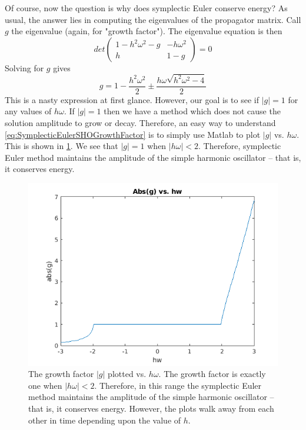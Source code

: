 \documentclass[hidelinks,notitlepage]{book}
\begin{document}
Of course, now the question is why does symplectic Euler conserve energy?  As usual, the answer lies in computing the eigenvalues of the propagator matrix.  Call $g$ the eigenvalue (again, for "growth factor").  The eigenvalue equation is then
\begin{equation}
\nonumber
	det
\begin{pmatrix}
	1 - h^2 \omega^2  - g  &  -h \omega^2 \\
	h & 1 - g
\end{pmatrix}
= 0
\end{equation}
Solving for $g$ gives
\begin{equation}
\label{eq:SymplecticEulerSHOGrowthFactor}
g = 1 - \frac{h^2 \omega^2}{2} \pm \frac{h \omega  \sqrt{h^2 \omega^2 - 4}}{2}
\end{equation}
This is a nasty expression at first glance.  However, our goal is to see if $|g| = 1$ for any values of $h \omega$.  If $|g| = 1$ then we have a method which does not cause the solution amplitude to grow or decay.  Therefore, an easy way to understand \cref{eq:SymplecticEulerSHOGrowthFactor} is to simply use Matlab to plot $|g|$ vs. $h \omega$.  This is shown in \cref{fig:SymplecticEulerGFactor}.  We see that $|g| = 1$ when $|h \omega| < 2$.  Therefore, symplectic Euler method maintains the amplitude of the simple harmonic oscillator -- that is, it conserves energy.  
\begin{figure}[h]
	\centering
	\includegraphics[width=0.7\columnwidth]{SymplecticEulerGFactor.png}
	\caption{The growth factor $|g|$ plotted vs. $h \omega$.  The growth factor is exactly one when $|h \omega| < 2$.  Therefore, in this range the symplectic Euler method maintains the amplitude of the simple harmonic oscillator -- that is, it conserves energy.  However, the plots walk away from each other in time depending upon the value of $h$.}
	\label{fig:SymplecticEulerGFactor}
\end{figure}
\end{document}
